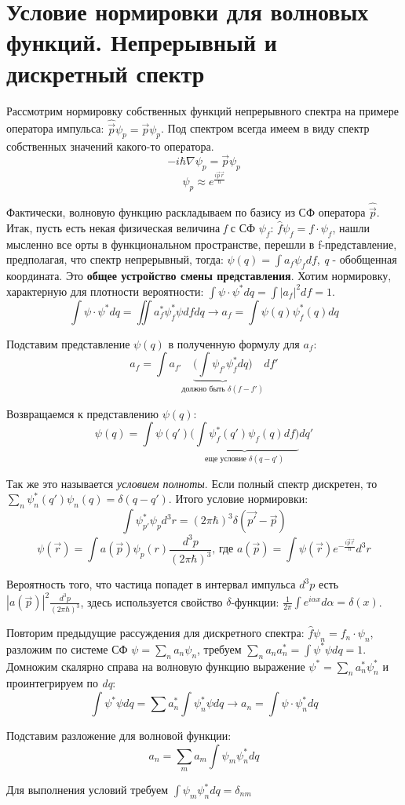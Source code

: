 \newpage
\chapter{Условие нормировки для волновых функций. Непрерывный и дискретный спектр}
\par Рассмотрим нормировку собственных функций непрерывного спектра на примере оператора импульса: $\hat{\vec{p}} \psi_p = \vec{p} \psi_p$. Под спектром всегда имеем в виду спектр собственных значений какого-то оператора.
$$ -i \hbar \nabla \psi_p = \vec{p} \psi_p $$
$$ \psi_p \approx  e^ \frac{i \vec{p} \vec{r}}{\hbar} $$
\par Фактически, волновую функцию раскладываем по базису из СФ оператора $\hat{\vec{p}}$. Итак, пусть есть некая физическая величина \textit{f} с СФ $\psi_f$: $\hat{f}\psi_f = f \cdot \psi_f$, нашли мысленно все орты в функциональном пространстве, перешли в f-представление, предполагая, что спектр непрерывный, тогда: $\psi (q)= \int a_f \psi_f df$, \textit{q} - обобщенная координата. Это \textbf{общее устройство смены представления}. Хотим нормировку, характерную для плотности вероятности: $\int \psi \cdot \psi^* dq = \int |a_f|^2 df =1$.
$$ \int \psi \cdot \psi^* dq = \iint a_f^* \psi_f^* \psi df dq \longrightarrow a_f = \int \psi(q) \psi_f^*(q) dq$$
\par Подставим представление $\psi (q)$ в полученную формулу для $a_f$: 
$$ a_f = \int a_{f\prime} \underbrace{\bigg( \int \psi_{f\prime} \psi_f^* dq \bigg)}_{\text{должно быть } \delta(f- f\prime)} df\prime $$
\par Возвращаемся к представлению $\psi (q)$:
$$ \psi (q) = \int \psi(q\prime) \underbrace{\bigg( \int \psi_f^*(q\prime) \psi_f (q) df \bigg)}_{\text{еще условие } \delta(q- q\prime)} dq\prime $$
\par Так же это называется \textit{ условием полноты}. Если полный спектр дискретен, то $\sum_{n} \psi_n^* (q\prime) \psi_n (q)= \delta(q- q\prime)$. Итого условие нормировки: 
$$ \int \psi_{p\prime}^*  \psi_p d^3r = (2 \pi \hbar) ^3 \delta (\vec{p\prime} - \vec{p})$$
$$ \psi(\vec{r}) = \int a(\vec{p}) \psi_p (r) \frac{d^3 p}{(2 \pi \hbar)^3} \text{, где }  a(\vec{p}) =\int \psi(\vec{r}) e^{-\frac{i \vec{p} \vec{r}}{\hbar}} d^3r $$
\par Вероятность того, что частица попадет в интервал импульса $d^3p$ есть $|a(\vec{p})|^2 \frac{d^3 p}{(2 \pi \hbar)^3} $, здесь используется свойство $\delta$-функции:
$\frac{1}{2 \pi} \int e^{i \alpha x} d \alpha = \delta (x)$.
\par Повторим предыдущие рассуждения для дискретного спектра:  $\hat{f}\psi_n = f_n \cdot \psi_n$, разложим по системе СФ $\psi = \sum_{n} a_n \psi_n$, требуем $\sum_{n}a_n a_n^* =\int \psi^* \psi dq =1 $. Домножим скалярно справа на волновую функцию выражение  $\psi^* = \sum_{n} a_n^* \psi_n^*$ и проинтегрируем по \textit{dq}:
$$ \int \psi^* \psi dq = \sum a_n^* \int \psi_n^* \psi dq \rightarrow a_n = \int \psi \cdot \psi_n^* dq$$
\par Подставим разложение для волновой функции:
$$ a_n = \sum_{m}a_m \int \psi_m \psi_n^* dq$$
\par Для выполнения условий требуем $\int \psi_m \psi_n^* dq = \delta_{nm}$